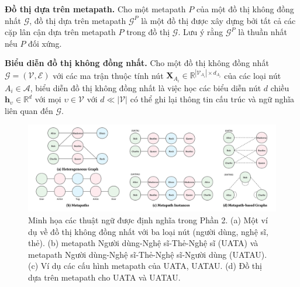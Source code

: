 \begin{definition}
  \textbf{Đồ thị dựa trên metapath.} Cho một metapath $P$ của một đồ thị không đồng nhất $\pmb{\mathcal{G}}$, đồ thị dựa trên metapath $\pmb{\mathcal{G}}^P$ là một đồ thị được xây dựng bởi tất cả các cặp lân cận dựa trên metapath $P$ trong đồ thị $\pmb{\mathcal{G}}$. Lưu ý rằng $\pmb{\mathcal{G}}^P$ là thuần nhất nếu $P$ đối xứng.
\end{definition}

\begin{definition}
  \textbf{Biểu diễn đồ thị không đồng nhất.} Cho một đồ thị không đồng nhất $\pmb{\mathcal{G}} = (\pmb{\mathcal{V}}, \pmb{\mathcal{E}})$ với các ma trận thuộc tính nút $\pmb{X}_{A_i} \in \mathbb{R} ^ {|\pmb{\mathcal{V}}_{A_i}| \times d_{A_i}}$ của các loại nút $A_i \in \pmb{\mathcal{A}}$, biểu diễn đồ thị không đồng nhất là việc học các biểu diễn nút $d$ chiều $\pmb{h}_{\upsilon} \in \mathbb{R}^d$ với mọi $\upsilon \in \pmb{\mathcal{V}}$ với $d \ll |\pmb{\mathcal{V}}|$ có thể ghi lại thông tin cấu trúc và ngữ nghĩa liên quan đến $\pmb{\mathcal{G}}$.
\end{definition}

\begin{figure}
  \includegraphics[width=\textwidth]{figs/fig1.png}
  \caption{Minh họa các thuật ngữ được định nghĩa trong Phần 2. (a) Một ví dụ về đồ thị không đồng nhất với ba loại nút (người dùng, nghệ sĩ, thẻ). (b) metapath Người dùng-Nghệ sĩ-Thẻ-Nghệ sĩ (UATA) và metapath Người dùng-Nghệ sĩ-Thẻ-Nghệ sĩ-Người dùng (UATAU). (c) Ví dụ các cấu hình metapath của UATA, UATAU. (d) Đồ thị dựa trên metapath cho UATA và UATAU.}
\end{figure}



